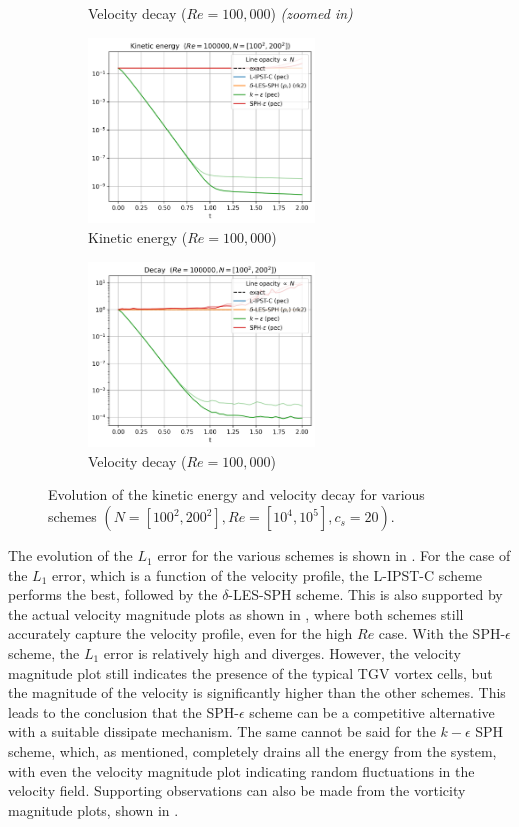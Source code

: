 \begin{figure}[htbp!]
\begin{subfigure}{7cm}
  \caption{Velocity decay ($Re = 100,000$) \textit{(zoomed in)}}
  \end{subfigure}
  \begin{subfigure}{7cm}
    \centering\includegraphics[width=6cm]{Code-Figures/long-tgv/ke_re_100000.png}
    \caption{Kinetic energy ($Re = 100,000$)}
    \end{subfigure}
  \begin{subfigure}{7cm}
    \centering\includegraphics[width=6cm]{Code-Figures/long-tgv/decay_re_100000.png}
    \caption{Velocity decay ($Re = 100,000$)}
  \end{subfigure}
  \caption{Evolution of the kinetic energy and velocity decay for various schemes $(N=[100^2, 200^2], Re=[10^4, 10^5], c_s=20)$.}
  \label{fig:ltgv-ke-decay}
\end{figure}

The evolution of the $L_1$ error for the various schemes is shown in .
For the case of the $L_1$ error, which is a function of the velocity profile, the L-IPST-C scheme performs the best, followed by the $\delta$-LES-SPH scheme.
This is also supported by the actual velocity magnitude plots as shown in , where both schemes still accurately capture the velocity profile, even for the high $Re$ case.
With the SPH-$\epsilon$ scheme, the $L_1$ error is relatively high and diverges. However, the velocity magnitude plot still indicates the presence of the typical TGV vortex cells, but the magnitude of the velocity is significantly higher than the other schemes. This leads to the conclusion that the SPH-$\epsilon$ scheme can be a competitive alternative with a suitable dissipate mechanism. 
The same cannot be said for the $k-\epsilon$ SPH scheme, which, as mentioned, completely drains all the energy from the system, with even the velocity magnitude plot indicating random fluctuations in the velocity field.
Supporting observations can also be made from the vorticity magnitude plots, shown in .

